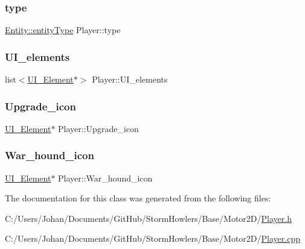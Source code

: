 \mbox{\label{class_player_a81e64dcef096cbaae8b3eeb8ae53c2e6}} 
\subsubsection{\texorpdfstring{type}{type}}
{\footnotesize\ttfamily \mbox{\hyperlink{class_entity_afd4a8ca3ac152f193c21d6a5100f1192}{Entity\+::entity\+Type}} Player\+::type}

\mbox{\label{class_player_ae2211c0d011cb65b9dce646a3254bd27}} 
\subsubsection{\texorpdfstring{UI\_elements}{UI\_elements}}
{\footnotesize\ttfamily list$<$\mbox{\hyperlink{class_u_i___element}{U\+I\+\_\+\+Element}}$\ast$$>$ Player\+::\+U\+I\+\_\+elements}

\mbox{\label{class_player_a73d0785a8215260f890693387c4cd9c1}} 
\subsubsection{\texorpdfstring{Upgrade\_icon}{Upgrade\_icon}}
{\footnotesize\ttfamily \mbox{\hyperlink{class_u_i___element}{U\+I\+\_\+\+Element}}$\ast$ Player\+::\+Upgrade\+\_\+icon}

\mbox{\label{class_player_af9215ac8219ee70227633d81316340ef}} 
\subsubsection{\texorpdfstring{War\_hound\_icon}{War\_hound\_icon}}
{\footnotesize\ttfamily \mbox{\hyperlink{class_u_i___element}{U\+I\+\_\+\+Element}}$\ast$ Player\+::\+War\+\_\+hound\+\_\+icon}



The documentation for this class was generated from the following files\+:\begin{DoxyCompactItemize}
\item 
C\+:/\+Users/\+Johan/\+Documents/\+Git\+Hub/\+Storm\+Howlers/\+Base/\+Motor2\+D/\mbox{\hyperlink{_player_8h}{Player.\+h}}\item 
C\+:/\+Users/\+Johan/\+Documents/\+Git\+Hub/\+Storm\+Howlers/\+Base/\+Motor2\+D/\mbox{\hyperlink{_player_8cpp}{Player.\+cpp}}\end{DoxyCompactItemize}
